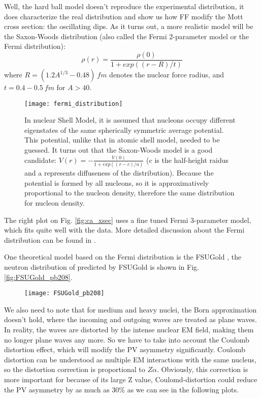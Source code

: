 Well, the hard ball model doesn't reproduce the experimental distribution, it does
characterize the real distribution and show us how FF modify the Mott cross section:
the oscillating dips. As it turns out, a more realistic model will be the
Saxon-Woods distribution (also called the Fermi 2-parameter model or the Fermi
distribution):
\begin{equation}
    \rho(r) = \frac{\rho(0)}{1 + exp((r-R)/t)}
\end{equation}
where $R = (1.2A^{1/3} - 0.48) \ fm$ denotes the nuclear force radius, 
and $t = 0.4-0.5 \ fm$ for  $A > 40$.
\begin{figure}
    \centering
    \texttt{[image: fermi\_distribution]}
    \caption{In nuclear Shell Model, it is assumed that nucleons occupy 
    different eigenstates of the same spherically symmetric average potential.
    This potential, unlike that in atomic shell model, needed to be guessed. 
    It turns out that the Saxon-Woods model is a good candidate: 
    $V(r) = -\frac{V(0)}{1+exp((r-c)/a)}$ (c is the half-height raidus and a represents
    diffuseness of the distribution). Because the potential is formed
    by all nucleons, so it is approximatively proportional to the nucleon density, 
    therefore the same distribution for nucleon density.} 
\end{figure}
The right plot on Fig. \ref{fig:ca_xsec} uses a fine tuned Fermi 3-parameter model,
which fits quite well with the data. More detailed discussion about the Fermi 
distribution can be found in \cite{Maximon:1966sqn}.

One theoretical model based on the Fermi distribution is the FSUGold \cite{PhysRevLett.95.122501},
the neutron distribution of \Pb predicted by FSUGold is shown in Fig. \ref{fig:FSUGold_pb208}.
\begin{figure}[h!]
    \centering
    \texttt{[image: FSUGold\_pb208]}
\end{figure}

We also need to note that for medium and heavy nuclei, the Born approximation
doesn't hold, where the incoming and outgoing waves are treated as plane waves.
In reality, the waves are distorted by the intense nuclear EM field, making them
no longer plane waves any more. So we have to take into account the 
Coulomb distortion effect, which will modify the PV asymmetry significantly.
Coulomb distortion can be understood as multiple EM interactions with
the same nucleus, so the distortion correction is proportional to $Z\alpha$. 
Obviously, this correction is more important for \Pb because of its large Z value,
Coulomd-distortion could reduce the PV asymmetry by as much as 30\% as we can see
in the following plots.


